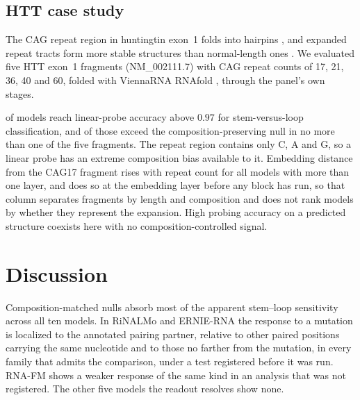 \documentclass[11pt]{article}
\begin{document}
\subsection{HTT case study}
\label{sec:htt-results}

The CAG repeat region in huntingtin exon~1 folds into hairpins
\citep{demezer2011mutant}, and expanded repeat tracts form more stable
structures than normal-length ones \citep{krzyzosiak2012triplet}. We evaluated
five HTT exon~1 fragments (NM\_002111.7) with CAG repeat counts of 17, 21, 36,
40 and 60, folded with ViennaRNA RNAfold \citep{lorenz2011viennarna}, through
the panel's own stages.



\httHighProbing{} of \httModels{} models reach linear-probe accuracy above
$0.97$ for stem-versus-loop classification, and \httHighProbingClean{} of those
exceed the composition-preserving null in no more than one of the five
fragments. The repeat region contains only C, A and G, so a linear probe has an
extreme composition bias available to it. Embedding distance from the CAG17
fragment rises with repeat count for all \httMonotone{} models with more than
one layer, and does so at the embedding layer before any block has run, so that
column separates fragments by length and composition and does not rank models
by whether they represent the expansion. High probing accuracy on a predicted
structure coexists here with no composition-controlled signal.


\section{Discussion}
\label{sec:discussion}

Composition-matched nulls absorb most of the apparent stem--loop
sensitivity across all ten models. In RiNALMo and ERNIE-RNA the response to a
mutation is localized to the annotated pairing partner, relative to other
paired positions carrying the same nucleotide and to those no farther from the
mutation, in every family that admits the comparison, under a test registered
before it was run. RNA-FM shows a weaker response of the same kind in an
analysis that was not registered. The other five models the readout resolves
show none.
\end{document}
